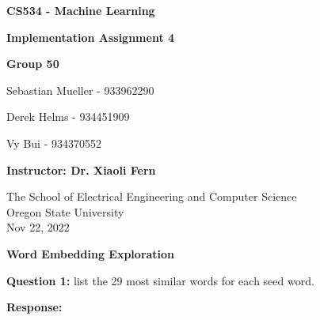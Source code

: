 \documentclass[12pt,article]{article}
\newcommand\projnumber{4}
\begin{document}
\begin{titlepage}
    \begin{center}
        \vspace*{4cm}

        \textbf{\Large CS534 - Machine Learning}

        \vspace{0.5cm}
 
        \textbf{\Large Implementation Assignment \projnumber{}}
 
        \vspace{1cm}

        \textbf{Group 50}

        Sebastian Mueller - 933962290

        Derek Helms - 934451909

        Vy Bui - 934370552
        
        

        \vspace{2cm}

        \textbf{Instructor: Dr. Xiaoli Fern}
        \vfill
             
        \vspace{0.8cm}
      
             
        The School of Electrical Engineering and Computer Science\\
        Oregon State University\\
        \vspace{3pt}
        Nov 22, 2022     
    \end{center}
\end{titlepage}

\newpage

\begin{center} \Large{\textbf{Word Embedding Exploration }} \end{center}
\textbf{Question 1:}\newline
list the 29 most similar words
for each seed word.\newline

\textbf{Response:}\newline
\end{document}
